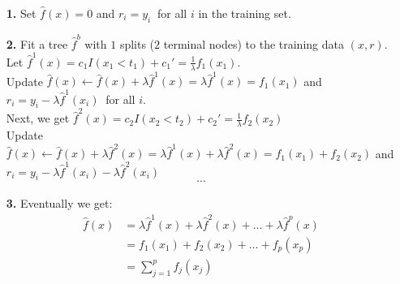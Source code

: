 \documentclass[twoside,11pt]{homework}
\begin{document}
\begin{enumerate}
	
	\item[\textbf{1.}] Set $\hat{f}(x) = 0$ and $r_i = y_i\ $ for all $i$ in the training set.
	
	\item[\textbf{2.}] Fit a tree $\hat{f}^b$ with $1$ splits ($2$ terminal nodes) to the training data $(x,r)$.\\
	 Let $\hat{f}^1(x) = c_1I(x_1 < t_1) + c_1' = \frac{1}{\lambda}f_1(x_1)$.\\
	 Update $\hat{f}(x) \leftarrow \hat{f}(x) + \lambda\hat{f}^1(x) = \lambda\hat{f}^1(x) = f_1(x_1)$ and $r_i = y_i - \lambda\hat{f}^1(x_i)\ $ for all $i$.\\
	 Next, we get $\hat{f}^2(x) = c_2I(x_2 < t_2) + c_2' = \frac{1}{\lambda}f_2(x_2)$\\
	 Update $\hat{f}(x) \leftarrow \hat{f}(x) + \lambda\hat{f}^2(x)  = \lambda\hat{f}^1(x) + \lambda\hat{f}^2(x) = f_1(x_1) + f_2(x_2)$ and $r_i = y_i - \lambda\hat{f}^1(x_i) - \lambda\hat{f}^2(x_i)$\\
	 $$\cdots$$

	 
	 \item[\textbf{3.}] Eventually we get:
	 \begin{align*}
	 \hat{f}(x)
	 &= \lambda\hat{f}^1(x) + \lambda\hat{f}^2(x) + \ldots + \lambda\hat{f}^p(x) \\
	 &= f_1(x_1) + f_2(x_2) + \ldots + f_p(x_p)\\
	 &=   \sum_{j = 1}^p f_j(x_j)
	 \end{align*}
	 



\end{enumerate}
\end{document}

